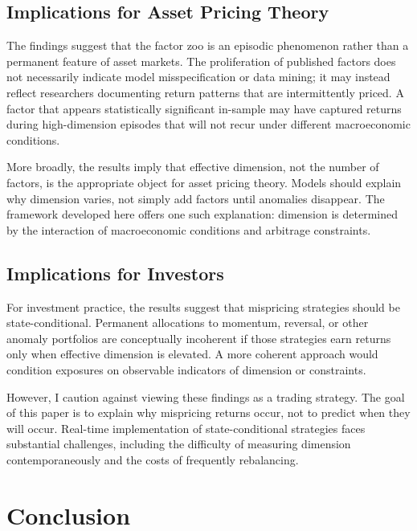\documentclass[12pt,letterpaper]{article}
\theoremstyle{plain}
\theoremstyle{definition}
\begin{document}
\subsection{Implications for Asset Pricing Theory}\label{subsec:implications_theory}

The findings suggest that the factor zoo is an episodic phenomenon rather than a permanent feature of asset markets. The proliferation of published factors does not necessarily indicate model misspecification or data mining; it may instead reflect researchers documenting return patterns that are intermittently priced. A factor that appears statistically significant in-sample may have captured returns during high-dimension episodes that will not recur under different macroeconomic conditions.

More broadly, the results imply that effective dimension, not the number of factors, is the appropriate object for asset pricing theory. Models should explain why dimension varies, not simply add factors until anomalies disappear. The framework developed here offers one such explanation: dimension is determined by the interaction of macroeconomic conditions and arbitrage constraints.

\subsection{Implications for Investors}\label{subsec:implications_investors}

For investment practice, the results suggest that mispricing strategies should be state-conditional. Permanent allocations to momentum, reversal, or other anomaly portfolios are conceptually incoherent if those strategies earn returns only when effective dimension is elevated. A more coherent approach would condition exposures on observable indicators of dimension or constraints.

However, I caution against viewing these findings as a trading strategy. The goal of this paper is to explain why mispricing returns occur, not to predict when they will occur. Real-time implementation of state-conditional strategies faces substantial challenges, including the difficulty of measuring dimension contemporaneously and the costs of frequently rebalancing.


\section{Conclusion}\label{sec:conclusion}
\end{document}
